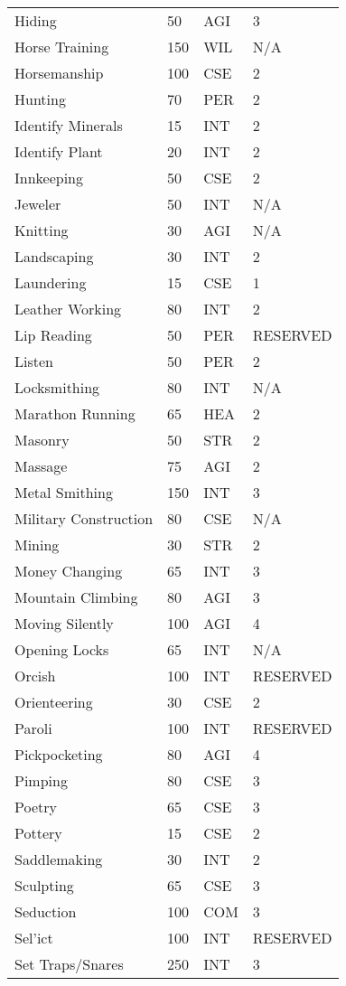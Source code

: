 \begin{multicols*}{2}
\begin{tcolorbox}[breakable,boxrule=0pt]
\begin{xtabular}{l l l l}
Hiding & 50 & AGI & 3 \\
Horse Training & 150 & WIL & N/A \\
Horsemanship & 100 & CSE & 2 \\
Hunting & 70 & PER & 2 \\
Identify Minerals & 15 & INT & 2 \\
Identify Plant & 20 & INT & 2 \\
Innkeeping & 50 & CSE & 2 \\
Jeweler & 50 & INT & N/A \\
Knitting & 30 & AGI & N/A \\
Landscaping & 30 & INT & 2 \\
Laundering & 15 & CSE & 1 \\
Leather Working & 80 & INT & 2 \\
Lip Reading & 50 & PER & RESERVED \\
Listen & 50 & PER & 2 \\
Locksmithing & 80 & INT & N/A \\
Marathon Running & 65 & HEA & 2 \\
Masonry & 50 & STR & 2 \\
Massage & 75 & AGI & 2 \\
Metal Smithing & 150 & INT & 3 \\
Military Construction & 80 & CSE & N/A \\
Mining & 30 & STR & 2 \\
Money Changing & 65 & INT & 3 \\
Mountain Climbing & 80 & AGI & 3 \\
Moving Silently & 100 & AGI & 4 \\
Opening Locks & 65 & INT & N/A \\
Orcish & 100 & INT & RESERVED \\
Orienteering & 30 & CSE & 2 \\
Paroli & 100 & INT & RESERVED \\
Pickpocketing & 80 & AGI & 4 \\
Pimping & 80 & CSE & 3 \\
Poetry & 65 & CSE & 3 \\
Pottery & 15 & CSE & 2 \\
Saddlemaking & 30 & INT & 2 \\
Sculpting & 65 & CSE & 3 \\
Seduction & 100 & COM & 3 \\
Sel'ict & 100 & INT & RESERVED \\
Set Traps/Snares & 250 & INT & 3 \\

\end{xtabular}
\end{tcolorbox}
\end{multicols*}
